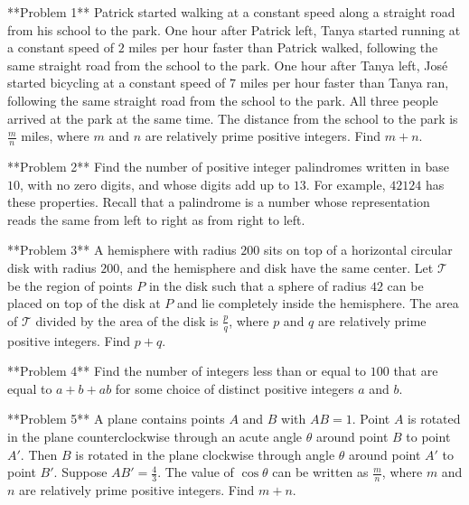 **Problem 1**
Patrick started walking at a constant speed along a straight road from his school to the park. One hour after Patrick left, Tanya started running at a constant speed of $2$ miles per hour faster than Patrick walked, following the same straight road from the school to the park. One hour after Tanya left, José started bicycling at a constant speed of $7$ miles per hour faster than Tanya ran, following the same straight road from the school to the park. All three people arrived at the park at the same time. The distance from the school to the park is $\frac{m}{n}$ miles, where $m$ and $n$ are relatively prime positive integers. Find $m+n$.

**Problem 2**
Find the number of positive integer palindromes written in base $10$, with no zero digits, and whose digits add up to $13$. For example, $42124$ has these properties. Recall that a palindrome is a number whose representation reads the same from left to right as from right to left.

**Problem 3**
A hemisphere with radius $200$ sits on top of a horizontal circular disk with radius $200$, and the hemisphere and disk have the same center. Let $\mathcal{T}$ be the region of points $P$ in the disk such that a sphere of radius $42$ can be placed on top of the disk at $P$ and lie completely inside the hemisphere. The area of $\mathcal{T}$ divided by the area of the disk is $\frac{p}{q}$, where $p$ and $q$ are relatively prime positive integers. Find $p+q$.

**Problem 4**
Find the number of integers less than or equal to $100$ that are equal to $a+b+ab$ for some choice of distinct positive integers $a$ and $b$.

**Problem 5**
A plane contains points $A$ and $B$ with $AB = 1$. Point $A$ is rotated in the plane counterclockwise through an acute angle $\theta$ around point $B$ to point $A'$. Then $B$ is rotated in the plane clockwise through angle $\theta$ around point $A'$ to point $B'$. Suppose $AB' = \frac{4}{3}$. The value of $\cos \theta$ can be written as $\frac{m}{n}$, where $m$ and $n$ are relatively prime positive integers. Find $m+n$.
